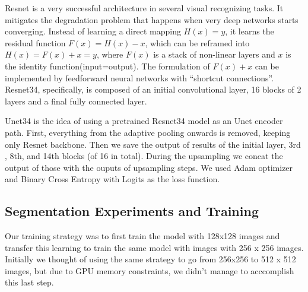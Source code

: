 \documentclass[conference]{IEEEtran}
\begin{document}
Resnet is a very successful architecture in several visual recognizing tasks\cite{he}. It mitigates the degradation problem that happens when very deep networks starts converging. Instead of learning a direct mapping $H(x) = y$, it learns the residual function  $F(x) = H(x)-x$, which can be reframed into $H(x) = F(x)+x = y$, where $F(x)$ is a stack of non-linear layers and $x$ is the identity function(input=output). The formulation of $F(x)+x$ can be implemented by feedforward neural networks with “shortcut connections”. Resnet34, specifically, is composed of an initial convolutional layer, 16 blocks of 2 layers and a final fully connected layer.

Unet34 is the idea of using a pretrained Resnet34 model as an Unet encoder path\cite{fastai}. First, everything from the adaptive pooling onwards is removed, keeping only Resnet backbone. Then we save the output of results of the initial layer, 3rd , 8th, and 14th blocks (of 16 in total). During the upsampling we concat the output of those with the ouputs of upsampling steps. We used Adam optimizer and Binary Cross Entropy with Logits as the loss function.

\subsection{Segmentation Experiments and Training}
\label{sec:seg_training}
Our training strategy was to first train the model with 128x128 images and transfer this learning to train the same model with images with 256 x 256 images. Initially we thought of using the same strategy to go from 256x256 to 512 x 512 images, but due to GPU memory constraints, we didn't manage to acccomplish this last step.
\end{document}
